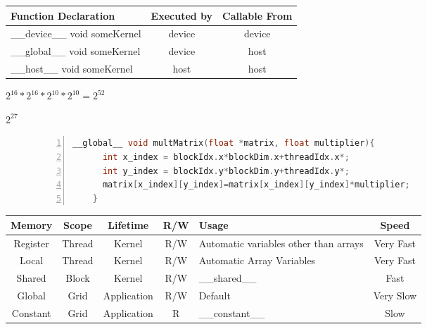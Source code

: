 {{\newpage\clearpage
{}%
\begin{table}\begin{tabularx}{\textwidth}{|X|c|c|}
Function Declaration&Executed by&Callable From\\\hline
\_\_device\_\_ void someKernel&device&device\\
\_\_global\_\_ void someKernel&device&host\\
\_\_host\_\_ void someKernel&host&host\\
\end{tabularx}
\end{table}%
\lthtmlfigureZ
\lthtmlcheckvsize\clearpage}

{\newpage\clearpage
{}%
$ 2^{16}*2^{16}*2^{10}*2^{10}=2^{52}$%
\lthtmlinlinemathZ
\lthtmlcheckvsize\clearpage}

{\newpage\clearpage
{}%
$ 2^{27}$%
\lthtmlinlinemathZ
\lthtmlcheckvsize\clearpage}

{\newpage\clearpage
{}%
\begin{figure}  \centering
    \begin{lstlisting}[numbers=left, language=C, numberstyle=\tiny , numbersep=8pt]
    __global__ void multMatrix(float *matrix, float multiplier){
      int x_index = blockIdx.x*blockDim.x+threadIdx.x*;
      int y_index = blockIdx.y*blockDim.y+threadIdx.y*;
      matrix[x_index][y_index]=matrix[x_index][y_index]*multiplier;
    }
    \end{lstlisting}
  
\end{figure}%
\lthtmlfigureZ
\lthtmlcheckvsize\clearpage}

{\newpage\clearpage
{}%
\begin{table}\begin{tabularx}{\textwidth}{|c|c|c|c|X|c|}\hline
Memory&Scope&Lifetime&R/W&Usage&Speed\\\hline
Register&Thread&Kernel&R/W&Automatic variables other than arrays&Very Fast\\
Local&Thread&Kernel&R/W&Automatic Array Variables&Very Fast\\\hline
Shared&Block&Kernel&R/W&\_\_shared\_\_&Fast\\\hline
Global&Grid&Application&R/W&Default&Very Slow\\
Constant&Grid&Application&R&\_\_constant\_\_&Slow\\\hline
\end{tabularx}


\end{table}}}

